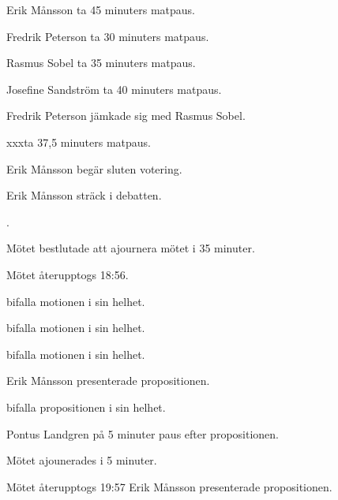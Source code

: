 \documentclass[10pt]{article}
\def\ji{xxx}
\begin{document}
\begin{paragrafer}
\begin{paragrafer}
        Erik Månsson \ypa ta 45 minuters matpaus.

        Fredrik Peterson \ypa ta 30 minuters matpaus.

        Rasmus Sobel \ypa ta 35 minuters matpaus.

        Josefine Sandström \ypa ta 40 minuters matpaus.

        Fredrik Peterson jämkade sig med Rasmus Sobel.

        \ji  \ypa ta 37,5 minuters matpaus.

        Erik Månsson begär sluten votering.

        Erik Månsson \ypa sträck i debatten.

        \Mbaby.

        Mötet bestlutade att ajournera mötet i 35 minuter.

        Mötet återupptogs 18:56.
    \end{paragrafer}

        \begin{paragrafer}




          \Mba bifalla motionen i sin helhet.


          \Mba bifalla motionen i sin helhet.


          \Mba bifalla motionen i sin helhet.
      \end{paragrafer}


          \begin{paragrafer}
            Erik Månsson presenterade propositionen.

            \Mba bifalla propositionen i sin helhet.

            Pontus Landgren \ypa på 5 minuter paus efter propositionen.

            Mötet ajounerades i 5 minuter.

            Mötet återupptogs 19:57
            Erik Månsson presenterade propositionen.


\end{paragrafer}
\end{paragrafer}
\end{document}
